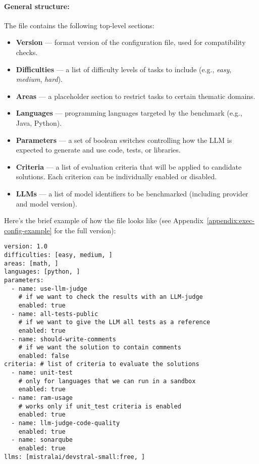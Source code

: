 \paragraph{General structure:}
The file contains the following top-level sections:

\begin{itemize}
    \item \textbf{Version} --- format version of the configuration file, used for compatibility checks.
    \item \textbf{Difficulties} --- a list of difficulty levels of tasks to include (e.g., \emph{easy}, \emph{medium}, \emph{hard}).
    \item \textbf{Areas} --- a placeholder section to restrict tasks to certain thematic domains.
    \item \textbf{Languages} --- programming languages targeted by the benchmark (e.g., Java, Python).
    \item \textbf{Parameters} --- a set of boolean switches controlling how the LLM is expected to generate and use code, tests, or libraries.
    \item \textbf{Criteria} --- a list of evaluation criteria that will be applied to candidate solutions. Each criterion can be individually enabled or disabled.
    \item \textbf{LLMs} --- a list of model identifiers to be benchmarked (including provider and model version).
\end{itemize}

Here's the brief example of how the file looks like (see Appendix~\ref{appendix:exec-config-example} for the full version):

\begin{verbatim}
version: 1.0
difficulties: [easy, medium, ]
areas: [math, ]
languages: [python, ]
parameters:
  - name: use-llm-judge
    # if we want to check the results with an LLM-judge
    enabled: true
  - name: all-tests-public
    # if we want to give the LLM all tests as a reference
    enabled: true
  - name: should-write-comments
    # if we want the solution to contain comments
    enabled: false
criteria: # list of criteria to evaluate the solutions
  - name: unit-test
    # only for languages that we can run in a sandbox
    enabled: true
  - name: ram-usage
    # works only if unit_test criteria is enabled
    enabled: true
  - name: llm-judge-code-quality
    enabled: true
  - name: sonarqube
    enabled: true
llms: [mistralai/devstral-small:free, ]
\end{verbatim}

